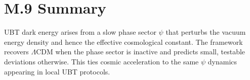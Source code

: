 \documentclass[12pt]{article}
\begin{document}
\section*{M.9 Summary}
UBT dark energy arises from a slow phase sector $\psi$ that perturbs the vacuum energy density and hence the effective cosmological constant. The framework recovers $\Lambda$CDM when the phase sector is inactive and predicts small, testable deviations otherwise. This ties cosmic acceleration to the same $\psi$ dynamics appearing in local UBT protocols.
\end{document}
